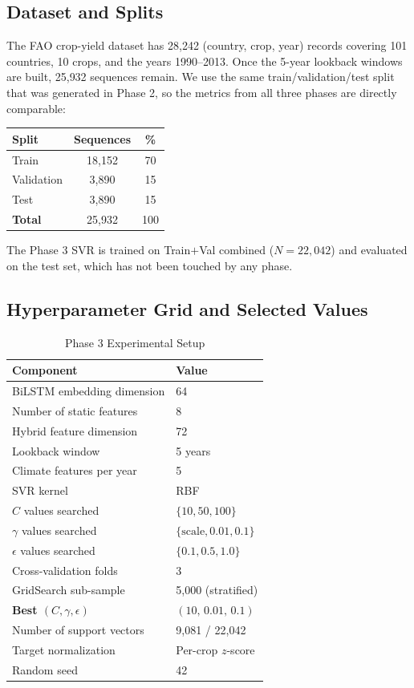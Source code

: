 \documentclass[conference]{IEEEtran}
\begin{document}
\subsection{Dataset and Splits}
The FAO crop-yield dataset has 28{,}242 (country, crop, year) records covering 101 countries, 10 crops, and the years 1990--2013. Once the 5-year lookback windows are built, 25{,}932 sequences remain. We use the same train/validation/test split that was generated in Phase 2, so the metrics from all three phases are directly comparable:
\begin{center}
\begin{tabular}{lcc}
\toprule
Split & Sequences & \% \\
\midrule
Train       & 18{,}152 & 70 \\
Validation  & \phantom{0}3{,}890 & 15 \\
Test        & \phantom{0}3{,}890 & 15 \\
\midrule
\textbf{Total} & 25{,}932 & 100 \\
\bottomrule
\end{tabular}
\end{center}
The Phase 3 SVR is trained on Train$+$Val combined ($N=22{,}042$) and evaluated on the test set, which has not been touched by any phase.

\subsection{Hyperparameter Grid and Selected Values}

\begin{table}[H]
\caption{Phase 3 Experimental Setup}
\label{tab:setup}
\centering
\begin{tabular}{ll}
\toprule
\textbf{Component} & \textbf{Value} \\
\midrule
BiLSTM embedding dimension & 64 \\
Number of static features  & 8 \\
Hybrid feature dimension   & 72 \\
Lookback window            & 5 years \\
Climate features per year  & 5 \\
SVR kernel                 & RBF \\
$C$ values searched        & $\{10, 50, 100\}$ \\
$\gamma$ values searched   & $\{\text{scale}, 0.01, 0.1\}$ \\
$\epsilon$ values searched & $\{0.1, 0.5, 1.0\}$ \\
Cross-validation folds     & 3 \\
GridSearch sub-sample      & 5{,}000 (stratified) \\
\textbf{Best $(C,\gamma,\epsilon)$} & $(10,\, 0.01,\, 0.1)$ \\
Number of support vectors  & 9{,}081 / 22{,}042 \\
Target normalization       & Per-crop $z$-score \\
Random seed                & 42 \\
\bottomrule
\end{tabular}
\end{table}
\end{document}
